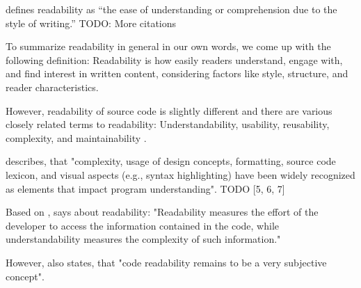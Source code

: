 \documentclass[%
class=scrreprt,
chapterprefix=false,%
open=right,%
twoside=false,%
paper=a4,%
logofile={Logo\_zentral\_farbig\_EN.png},%
thesistype=master,%
UKenglish,%
]{se2thesis}
\begin{document}
	\citeauthor{klare1964measurement} defines readability as “the ease of understanding or comprehension due to the style of writing.” TODO: More citations
	

	To summarize readability in general in our own words, we come up with the following definition:
	Readability is how easily readers understand, engage with, and find interest in written content, considering factors like style, structure, and reader characteristics.
	
	However, readability of source code is slightly different and there are various closely related terms to readability: Understandability, usability, reusability, complexity, and maintainability \citeauthor{tashtoush2013impact}.
	
	\citeauthor{scalabrino2018comprehensive} describes, that "complexity, usage of design concepts, formatting, source code lexicon, and visual aspects (e.g., syntax
	highlighting) have been widely recognized as elements that impact program understanding". TODO [5, 6, 7]
	
	Based on \citeauthor{posnett2011simpler}, \citeauthor{scalabrino2018comprehensive} says about readability: "Readability measures the effort of the developer to access the information contained in the code, while understandability measures the complexity of such information."
	
	However, \citeauthor{scalabrino2018comprehensive} also states, that "code readability remains to be a very subjective concept".
	
\end{document}
